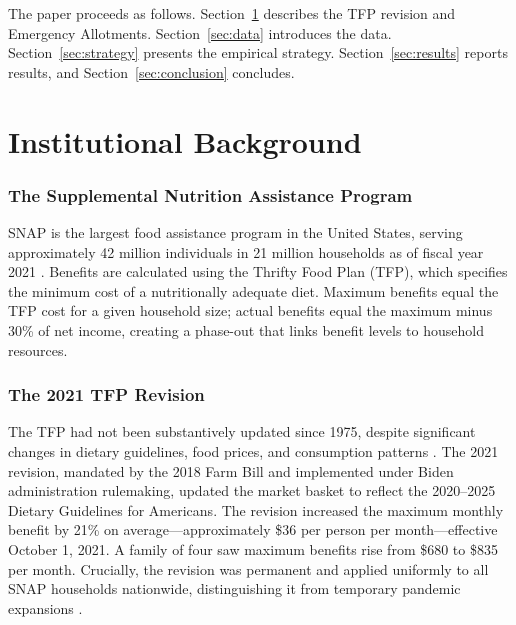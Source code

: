 \documentclass[12pt]{article}
\begin{document}
The paper proceeds as follows. Section~\ref{sec:background} describes the TFP revision and Emergency Allotments. Section~\ref{sec:data} introduces the data. Section~\ref{sec:strategy} presents the empirical strategy. Section~\ref{sec:results} reports results, and Section~\ref{sec:conclusion} concludes.

\section{Institutional Background}
\label{sec:background}

\subsubsection*{The Supplemental Nutrition Assistance Program} SNAP is the largest food assistance program in the United States, serving approximately 42 million individuals in 21 million households as of fiscal year 2021 \citep{usda_snap_2022}. Benefits are calculated using the Thrifty Food Plan (TFP), which specifies the minimum cost of a nutritionally adequate diet. Maximum benefits equal the TFP cost for a given household size; actual benefits equal the maximum minus 30\% of net income, creating a phase-out that links benefit levels to household resources.

\subsubsection*{The 2021 TFP Revision} The TFP had not been substantively updated since 1975, despite significant changes in dietary guidelines, food prices, and consumption patterns \citep{carlson2007thrifty}. The 2021 revision, mandated by the 2018 Farm Bill and implemented under Biden administration rulemaking, updated the market basket to reflect the 2020--2025 Dietary Guidelines for Americans. The revision increased the maximum monthly benefit by 21\% on average---approximately \$36 per person per month---effective October 1, 2021. A family of four saw maximum benefits rise from \$680 to \$835 per month. Crucially, the revision was permanent and applied uniformly to all SNAP households nationwide, distinguishing it from temporary pandemic expansions \citep{usda_tfp_2021}.
\end{document}
